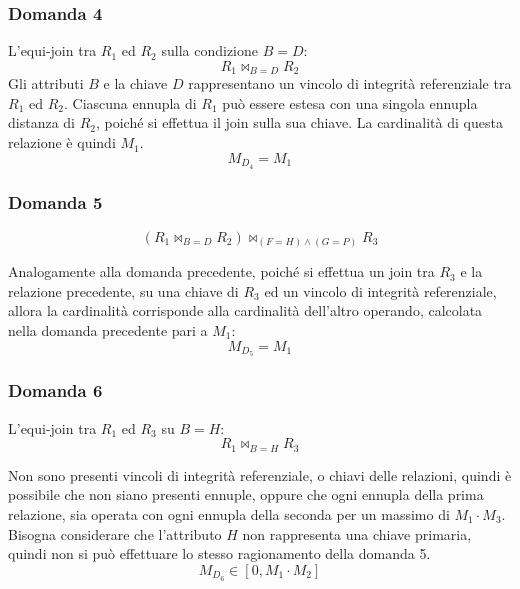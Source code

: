 \documentclass{article}
\begin{document}
\subsubsection*{Domanda 4}

L'equi-join tra $R_1$ ed $R_2$ sulla condizione $B=D$:
\begin{equation*}
    R_1\Join_{B=D}R_2
\end{equation*}
Gli attributi $B$ e la chiave $D$ rappresentano un vincolo di integrità referenziale tra $R_1$ ed $R_2$. Ciascuna ennupla di $R_1$ può essere estesa con una singola ennupla distanza di $R_2$, 
poiché si effettua il join sulla sua chiave. La cardinalità di questa relazione è quindi $M_1$.  
\begin{equation}
    M_{D_4}=M_1
\end{equation}

\subsubsection*{Domanda 5}

\begin{equation*}
    (R_1\Join_{B=D}R_2)\Join_{(F=H)\land(G=P)}R_3
\end{equation*}

Analogamente alla domanda precedente, poiché si effettua un join tra $R_3$ e la relazione precedente, su una chiave di $R_3$ ed un vincolo di integrità referenziale, allora la cardinalità 
corrisponde alla cardinalità dell'altro operando, calcolata nella domanda precedente pari a $M_1$:
\begin{equation}
    M_{D_5}=M_1
\end{equation}

\subsubsection*{Domanda 6}

L'equi-join tra $R_1$ ed $R_3$ su $B=H$:
\begin{equation*}
    R_1\Join_{B=H}R_3
\end{equation*}

Non sono presenti vincoli di integrità referenziale, o chiavi delle relazioni, quindi è possibile che non siano presenti ennuple, oppure che ogni ennupla della prima relazione, sia operata 
con ogni ennupla della seconda per un massimo di $M_1\cdot M_3$. Bisogna considerare che l'attributo $H$ non rappresenta una chiave primaria, quindi non si può effettuare lo stesso 
ragionamento della domanda 5. 
\begin{equation}
    M_{D_6}\in[0,M_1\cdot M_2]
\end{equation}
\end{document}
